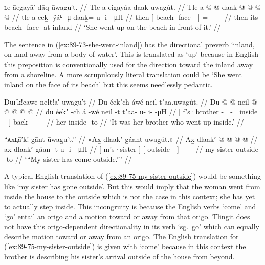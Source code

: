 \ex\label{ex:89-73-she-went-inland}%
%
\begingl
	\glpreamble	ʟe āeg̣ayā′ dāq ūwagu′t. //
	\glpreamble	Tle a eig̱ayáa daaḵ uwagút. //
	\gla	Tle {} a  @ {} @ {} {}
		daaḵ @  @ {} @ {} @ {} //
	\glb	tle {} a eeḵ- ÿáᵏ -μ {}
		daaḵ= u- i-  -μH //
	\glc	then {}[  beach- face - {}]
		= - -  - //
	\gld	then {} its beach- face -at {}
		inland  {} {} {} //
	\glft	‘She went up on the beach in front of it.’
		//
\endgl
\xe

The sentence in (\ref{ex:89-73-she-went-inland}) has the directional preverb  ‘inland, on land away from a body of water’.
This is translated as ‘up’ because in English this preposition is conventionally used for the direction toward the inland away from a shoreline.
A more scrupulously literal translation could be ‘She went inland on the face of its beach’ but this seems needlessly pedantic.

\ex\label{ex:89-74-brother-went-inside}%
%
\begingl
	\glpreamble	Duī′k!cawe nēłt!ā′ uwagu′t //
	\glpreamble	Du éekʼch áwé neil tʼaa.uwagút. //
	\gla	{} Du  @ {} {}  @ {}
		{} neil @ {} {}
		 @ {} @ {} @ {} @ {} //
	\glb	{} du éekʼ -ch {} á -wé
		{} neil -t {}
		tʼaa- u- i-  -μH //
	\glc	{}[  f’s·brother - {}]  -
		{}[ inside - {}]
		back- - -  - //
	\gld	{} her  {} {}  {}
		{} inside -to {}
		 {} {} {} {} //
	\glft	‘It was her brother who went up inside.’
		//
\endgl
\xe


\ex\label{ex:89-75-my-sister-outside}%
%
\begingl
	\glpreamble	“ᴀxʟ̣ā′k! gānt ūwagu′t.” //
	\glpreamble	«\!Ax̱ dlaakʼ gáant uwagút.\!» //
	\gla	{} Ax̱ dlaakʼ {}
		{}  @ {} {}
		 @ {} @ {} @ {} //
	\glb	{} ax̱ dlaakʼ {}
		{} gáan -t {}
		u- i-  -μH //
	\glc	{}[  m’s·sister {}]
		{}[ outside - {}]
		- -  - //
	\gld	{} my sister {}
		{} outside -to {}
		 {} {} {} //
	\glft	‘“My sister has come outside.”’
		//
\endgl
\xe

A typical English translation of (\ref{ex:89-75-my-sister-outside}) would be something like ‘my sister has gone outside’.
But this would imply that the woman went from inside the house to the outside which is not the case in this context; she has yet to actually step inside.
This incongruity is because the English verbs ‘come’ and ‘go’ entail an origo and a motion toward or away from that origo.
Tlingit does not have this origo-dependent directionality in its verb  ‘sg.\ go’ which can equally describe motion toward or away from an origo.
The English translation for (\ref{ex:89-75-my-sister-outside}) is given with ‘come’ because in this context the brother is describing his sister’s arrival outside of the house from beyond.

